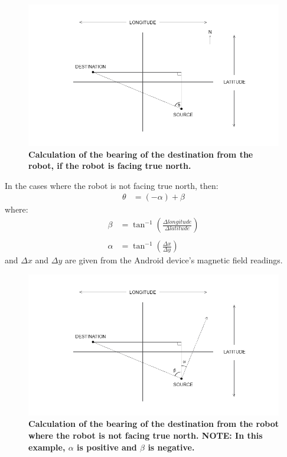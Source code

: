 \documentclass[titlepage,12pt,a4paper]{article}
\begin{document}
\begin{figure}[h]
	\centering
	\includegraphics[scale=0.5]{bearings.png}
	\caption{\textbf{Calculation of the bearing of the destination from the robot, if the robot is facing true north.}}
\end{figure}


\pagebreak


In the cases where the robot is not facing true north, then:
\begin{align*}
	\theta	&=	(-\alpha) + \beta
\end{align*}
where:
\begin{align*}
	\beta		&=	\tan^{-1}({\frac{\Delta{longitude}}{\Delta{latitude}}})\\ \\
	\alpha	&=	\tan^{-1}(\frac{\Delta{x}}{\Delta{y}})
\end{align*}
and $\Delta{x}$ and $\Delta{y}$ are given from the Android device's magnetic field readings.

\begin{figure}[h]
	\centering
	\includegraphics[scale=0.5]{bearingsOffset.png}
	\caption{\textbf{Calculation of the bearing of the destination from the robot where the robot is not facing true north. NOTE: In this example, $\alpha$ is positive and $\beta$ is negative.}}
\end{figure}
\end{document}
